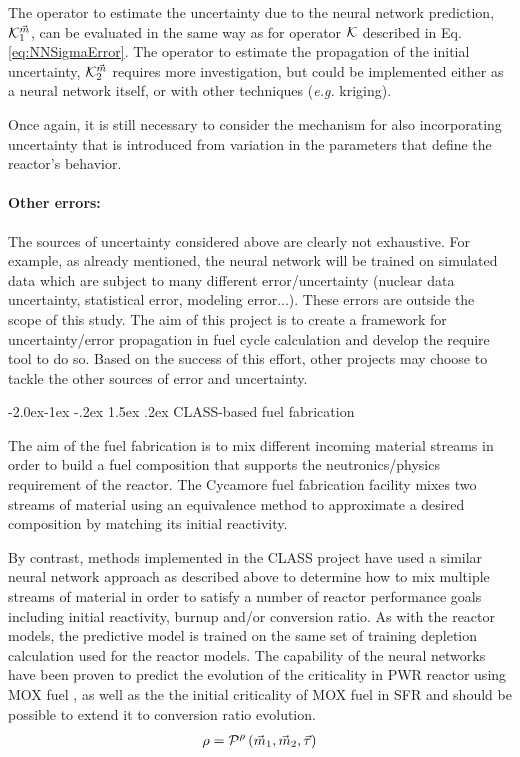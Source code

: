 \documentclass[dvips,12pt]{article}
\makeatletter
\renewcommand\subsubsection{\@startsection{subsubsection}{3}{\z@}%
                                     {-2.0ex\@plus -1ex \@minus -.2ex}%
                                     {1.5ex \@plus .2ex}%
                                     {\normalfont\bfseries}}%
\makeatother
\begin{document}
The operator to estimate the uncertainty due to
the neural network prediction, ${\cal
  K}_1^{{\vec{m}}}$, can be evaluated in the same way
as for operator ${\cal K}$ described in
Eq.\eqref{eq:NNSigmaError}. The operator to estimate
the propagation of the initial uncertainty,
${\cal K}_2^{{\vec{m}}}$ requires more investigation,
but could be implemented either as a neural
network itself, or with other techniques
(\textit{e.g.} kriging).

Once again, it is still necessary to consider the
mechanism for also incorporating uncertainty that
is introduced from variation in the parameters
that define the reactor's behavior.

\paragraph{Other errors:\\}

The sources of uncertainty considered above are
clearly not exhaustive. For example, as already
mentioned, the neural network will be trained on
simulated data which are subject to many different
error/uncertainty (nuclear data uncertainty,
statistical error, modeling error...).  These
errors are outside the scope of this study.  The
aim of this project is to create a framework for
uncertainty/error propagation in fuel cycle
calculation and develop the require tool to do so.
Based on the success of this effort, other
projects may choose to tackle the other sources of
error and uncertainty.

\subsubsection{CLASS-based fuel fabrication} \label{sec:fabrication}

The aim of the fuel fabrication is to mix
different incoming material streams in order to
build a fuel composition that supports the
neutronics/physics requirement of the reactor. The
Cycamore fuel fabrication facility mixes two
streams of material using an equivalence method to
approximate a desired composition by matching its
initial reactivity.  \cite{cycamore_fab}

By contrast, methods implemented in the CLASS
project have used a similar neural network
approach as described above to determine how to
mix multiple streams of material in order to
satisfy a number of reactor performance goals
including initial reactivity, burnup and/or
conversion ratio. As with the reactor models, the
predictive model is trained on the same set of
training depletion calculation used for the
reactor models. The capability of the neural
networks have been proven to predict the evolution
of the criticality in PWR reactor using MOX fuel
\cite{Leniau.ANE.2015}, as well as
the the initial criticality of MOX fuel in SFR
\cite{CLASS_UserGuide} and should be possible to
extend it to conversion ratio evolution.
\begin{align}
  \rho = {\cal P}^{\rho}\left( \vec{m}_{1},\vec{m}_{2}, \vec{\tau} \right)
\end{align}
\end{document}
